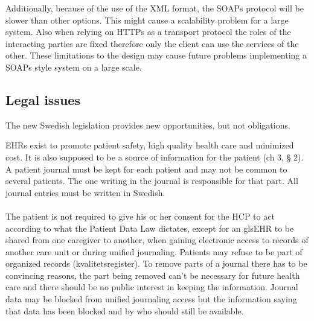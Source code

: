 \documentclass[14pt]{article}
\begin{document}
Additionally, because of the use of the \gls{XML} format, the \glspl{SOAP} protocol will be slower than other options. This might cause a scalability problem for a large system. Also when relying on \glspl{HTTP} as a transport protocol the roles of the interacting parties are fixed therefore only the client can use the services of the other. These limitations to the design may cause future problems implementing a \glspl{SOAP} style system on a large scale.



\subsection{Legal issues}

The new Swedish legislation provides new opportunities, but not obligations. \cite{RiR19}

\glspl{EHR} exist to promote patient safety, high quality health care and minimized cost. It is also supposed to be a source of information for the patient (ch 3, § 2). A patient journal must be kept for each patient and may not be common to several patients. The one writing in the journal is responsible for that part. All journal entries must be written in Swedish. \cite{PatientDataAct}
\\\\
The patient is not required to give his or her consent for the \gls{HCP} to act according to what the Patient Data Law dictates, except for an gls{EHR} to be shared from one caregiver to another, when gaining electronic access to records of another care unit or during unified journaling. Patients may refuse to be part of organized records (kvalitetsregister). To remove parts of a journal there has to be convincing reasons, the part being removed can't be necessary for future health care and there should be no public interest in keeping the information. Journal data may be blocked from unified journaling access but the information saying that data has been blocked and by who should still be available. 
\end{document}
